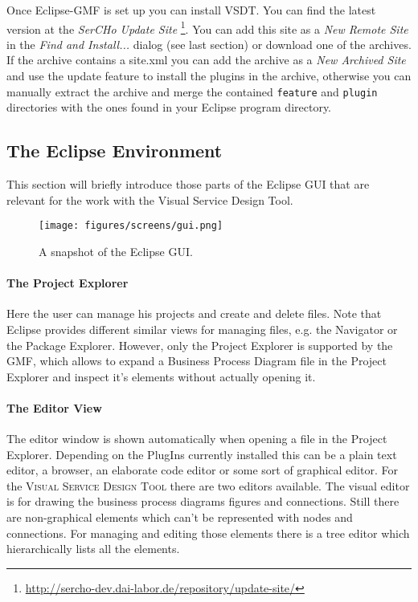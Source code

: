 Once Eclipse-GMF is set up you can install VSDT. You can find the latest version at the \emph{SerCHo Update Site} \footnote{\url{http://sercho-dev.dai-labor.de/repository/update-site/}}. You can add this site as a \emph{New Remote Site} in the \emph{Find and Install...} dialog (see last section) or download one of the archives. If the archive contains a site.xml you can add the archive as a \emph{New Archived Site} and use the update feature to install the plugins in the archive, otherwise you can manually extract the archive and merge the contained \verb|feature| and \verb|plugin| directories with the ones found in your Eclipse program directory.


\subsection{The Eclipse Environment}

This section will briefly introduce those parts of the Eclipse GUI that are relevant for the work with the Visual Service Design Tool.

\begin{figure}[htp]
\centering
\texttt{[image: figures/screens/gui.png]}
\caption[Snapshot of Eclipse GUI]{A snapshot of the Eclipse GUI.}
\label{fig:gui}
\end{figure}

\paragraph*{The Project Explorer}
Here the user can manage his projects and create and delete files.  Note that Eclipse provides different similar views for managing files, e.g. the Navigator or the Package Explorer. However, only the Project Explorer is supported by the GMF, which allows to expand a Business Process Diagram file in the Project Explorer and inspect it's elements without actually opening it.

\paragraph*{The Editor View}
The editor window is shown automatically when opening a file in the Project Explorer. Depending on the PlugIns currently installed this can be a plain text editor, a browser, an elaborate code editor or some sort of graphical editor. For the \textsc{Visual Service Design Tool} there are two editors available. The visual editor is for drawing the business process diagrams figures and connections. Still there are non-graphical elements which can't be represented with nodes and connections. For managing and editing those elements there is a tree editor which hierarchically lists all the elements.


